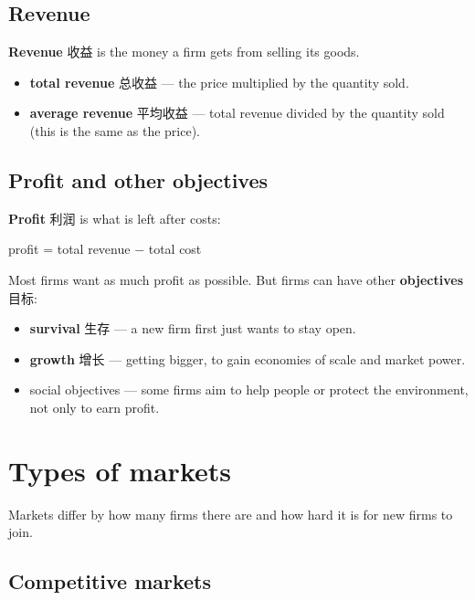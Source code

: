 \documentclass[11pt]{article}
\begin{document}
\subsection*{Revenue}

\textbf{Revenue} 收益 is the money a firm gets from selling its goods.

\begin{itemize}
\item \textbf{total revenue} 总收益 — the price multiplied by the quantity sold.

\item \textbf{average revenue} 平均收益 — total revenue divided by the quantity sold (this is the same as the price).

\end{itemize}

\subsection*{Profit and other objectives}

\textbf{Profit} 利润 is what is left after costs:

profit = total revenue − total cost

Most firms want as much profit as possible. But firms can have other \textbf{objectives} 目标:

\begin{itemize}
\item \textbf{survival} 生存 — a new firm first just wants to stay open.

\item \textbf{growth} 增长 — getting bigger, to gain economies of scale and market power.

\item social objectives — some firms aim to help people or protect the environment, not only to earn profit.

\end{itemize}

\section*{Types of markets}

Markets differ by how many firms there are and how hard it is for new firms to join.

\subsection*{Competitive markets}
\end{document}
